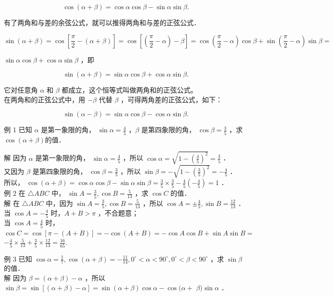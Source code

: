 \documentclass[10pt]{article}
\begin{document}
\[
\cos (\alpha+\beta)=\cos \alpha \cos \beta-\sin \alpha \sin \beta .
\]

有了两角和与差的余弦公式，就可以推得两角和与差的正弦公式．

\[
\sin (\alpha+\beta)=\cos \left[\frac{\pi}{2}-(\alpha+\beta)\right]=\cos \left[\left(\frac{\pi}{2}-\alpha\right)-\beta\right]=\cos \left(\frac{\pi}{2}-\alpha\right) \cos \beta+\sin \left(\frac{\pi}{2}-\alpha\right) \sin \beta=
\]

\(\sin \alpha \cos \beta+\cos \alpha \sin \beta\) ，即

\[
\sin (\alpha+\beta)=\sin \alpha \cos \beta+\cos \alpha \sin \beta .
\]

它对任意角 \(\alpha\) 和 \(\beta\) 都成立，这个恒等式叫做两角和的正弦公式。\\
在两角和的正弦公式中，用 \(-\beta\) 代替 \(\beta\) ，可得两角差的正弦公式，如下：

\[
\sin (\alpha-\beta)=\sin \alpha \cos \beta-\cos \alpha \sin \beta .
\]

例 1 已知 \(\alpha\) 是第一象限的角， \(\sin \alpha=\frac{4}{5}\) ，\(\beta\) 是第四象限的角， \(\cos \beta=\frac{3}{5}\) ，求 \(\cos (\alpha+\beta)\)的值．

解 因为 \(\alpha\) 是第一象限的角， \(\sin \alpha=\frac{4}{5}\) ，所以 \(\cos \alpha=\sqrt{1-\left(\frac{4}{5}\right)^{2}}=\frac{3}{5}\) ．\\
又因为 \(\beta\) 是第四象限的角， \(\cos \beta=\frac{3}{5}\) ，所以 \(\sin \beta=-\sqrt{1-\left(\frac{3}{5}\right)^{2}}=-\frac{4}{5}\) ．\\
所以， \(\cos (\alpha+\beta)=\cos \alpha \cos \beta-\sin \alpha \sin \beta=\frac{3}{5} \times \frac{3}{5}-\frac{4}{5}\left(-\frac{4}{5}\right)=1\) ．\\
例 2 在 \(\triangle A B C\) 中， \(\sin A=\frac{3}{5}, \cos B=\frac{5}{13}\) ，求 \(\cos C\) 的值．\\
解 在 \(\triangle A B C\) 中，因为 \(\sin A=\frac{3}{5}, \cos B=\frac{5}{13}\) ，所以 \(\cos A= \pm \frac{4}{5}, \sin B=\frac{12}{13}\) ．\\
当 \(\cos A=-\frac{4}{5}\) 时，\(A+B>\pi\) ，不合题意；\\
当 \(\cos A=\frac{4}{5}\) 时， \(\cos C=\cos [\pi-(A+B)]=-\cos (A+B)=-\cos A \cos B+\sin A \sin B=\) \(-\frac{4}{5} \times \frac{5}{13}+\frac{3}{5} \times \frac{12}{13}=\frac{16}{65}\).

例 3 已知 \(\cos \alpha=\frac{1}{7}, \cos (\alpha+\beta)=-\frac{11}{14}, 0^{\circ}<\alpha<90^{\circ}, 0^{\circ}<\beta<90^{\circ}\) ，求 \(\sin \beta\) 的值．\\
解 因为 \(\beta=(\alpha+\beta)-\alpha\) ，所以 \(\sin \beta=\sin [(\alpha+\beta)-\alpha]=\sin (\alpha+\beta) \cos \alpha-\cos (\alpha+\) \(\beta) \sin \alpha\) ．
\end{document}
